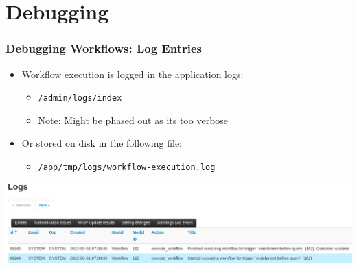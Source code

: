 \section{Debugging}
\begin{frame}
    \frametitle{Debugging Workflows: Log Entries}
    \begin{itemize}
        \item Workflow execution is logged in the application logs:
        \begin{itemize}
            \item \texttt{/admin/logs/index}
            \item Note: Might be phased out as its too verbose
        \end{itemize}
        \item Or stored on disk in the following file:
        \begin{itemize}
            \item \texttt{/app/tmp/logs/workflow-execution.log}
        \end{itemize}
    \end{itemize}
    \begin{center}
        \includegraphics[width=1.0\linewidth]{pictures/workflow-debug.png}
    \end{center}
\end{frame}

